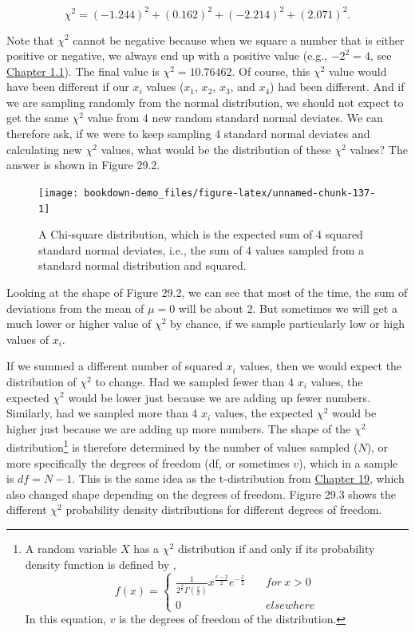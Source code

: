\documentclass[
]{scrbook}
\begin{document}
\[\chi^{2} = (-1.244)^{2} + (0.162)^{2} + (-2.214)^{2} + (2.071)^{2}.\]

Note that \(\chi^{2}\) cannot be negative because when we square a number that is either positive or negative, we always end up with a positive value (e.g., \(-2^{2} = 4\), see \protect\hyperlink{numbers-and-operations}{Chapter 1.1}).
The final value is \(\chi^{2} = 10.76462\).
Of course, this \(\chi^{2}\) value would have been different if our \(x_{i}\) values (\(x_{1}\), \(x_{2}\), \(x_{3}\), and \(x_{4}\)) had been different.
And if we are sampling randomly from the normal distribution, we should not expect to get the same \(\chi^{2}\) value from 4 new random standard normal deviates.
We can therefore ask, if we were to keep sampling 4 standard normal deviates and calculating new \(\chi^{2}\) values, what would be the distribution of these \(\chi^{2}\) values?
The answer is shown in Figure 29.2.

\begin{figure}
\texttt{[image: bookdown-demo\_files/figure-latex/unnamed-chunk-137-1]} \caption{A Chi-square distribution, which is the expected sum of 4 squared standard normal deviates, i.e., the sum of 4 values sampled from a standard normal distribution and squared.}\label{fig:unnamed-chunk-137}
\end{figure}

Looking at the shape of Figure 29.2, we can see that most of the time, the sum of deviations from the mean of \(\mu = 0\) will be about 2.
But sometimes we will get a much lower or higher value of \(\chi^{2}\) by chance, if we sample particularly low or high values of \(x_{i}\).

If we summed a different number of squared \(x_{i}\) values, then we would expect the distribution of \(\chi^{2}\) to change.
Had we sampled fewer than 4 \(x_{i}\) values, the expected \(\chi^{2}\) would be lower just because we are adding up fewer numbers.
Similarly, had we sampled more than 4 \(x_{i}\) values, the expected \(\chi^{2}\) would be higher just because we are adding up more numbers.
The shape of the \(\chi^{2}\) distribution\footnote{A random variable \(X\) has a \(\chi^{2}\) distribution if and only if its probability density function is defined by \citep{Miller2004}, \[f(x) = \left\{\begin{array}{ll}\frac{1}{2^{\frac{2}{v}}\Gamma\left(\frac{v}{2}\right)}x^{\frac{v-2}{2}}e^{-\frac{x}{2}} & \quad for\:x > 0 \\ 0 & \quad elsewhere \end{array}\right.\] In this equation, \(v\) is the degrees of freedom of the distribution.} is therefore determined by the number of values sampled (\(N\)), or more specifically the degrees of freedom (df, or sometimes \(v\)), which in a sample is \(df = N - 1\).
This is the same idea as the t-distribution from \protect\hyperlink{Chapter_19}{Chapter 19}, which also changed shape depending on the degrees of freedom.
Figure 29.3 shows the different \(\chi^{2}\) probability density distributions for different degrees of freedom.
\end{document}
